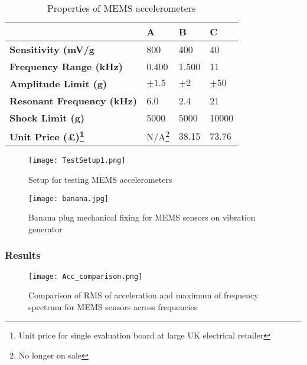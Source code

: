 \begin{savenotes}
\begin{table}
    \renewcommand{\arraystretch}{1.5}
	\begin{center}
		\begin{tabular}{llll}%
			\toprule
			  & \textbf{A} & \textbf{B} & \textbf{C}  \\
			\midrule
			\textbf{Sensitivity (mV/g} & 800 & 400 & 40 \\
			\textbf{Frequency Range (kHz)} & 0.400 & 1.500 & 11\\
			\textbf{Amplitude Limit (g)} & $\pm 1.5$ & $\pm 2$ & $\pm 50$\\
			\textbf{Resonant Frequency (kHz)} & 6.0 & 2.4 & 21\\
			\textbf{Shock Limit (g)} & 5000 & 5000 & 10000\\
			\textbf{Unit Price (£)\footnote{Unit price for single evaluation board at large UK electrical retailer}} & N/A\footnote{No longer on sale} & 38.15 & 73.76\\
			\bottomrule
		\end{tabular}
		\caption{Properties of MEMS accelerometers \cite{ADXL354}\cite{MMA7361}\cite{ADXL1002}}
		\label{tab:MEMS}%
	\end{center}
\end{table}
\end{savenotes}

\begin{figure}
    \centering
    \texttt{[image: TestSetup1.png]}
    \caption{Setup for testing MEMS accelerometers}
    \label{fig:Acc_Test_Setup}
\end{figure}

\begin{figure}
    \centering
    \texttt{[image: banana.jpg]}
    \caption{Banana plug mechanical fixing for MEMS sensors on vibration generator}
    \label{fig:Banana}
\end{figure}


\subsubsection{Results}

\begin{figure}
    \centering
    \texttt{[image: Acc\_comparison.png]}
    \caption{Comparison of RMS of acceleration and maximum of frequency spectrum for MEMS sensors across frequencies}
    \label{fig:Acc_comparison}
\end{figure}

